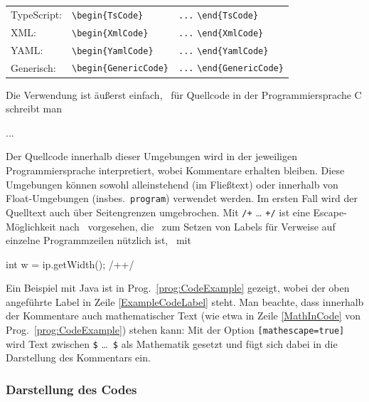 \begin{table}
\begin{tabular}{@{}lll@{}}
	TypeScript:  & \verb!\begin{TsCode}!
		& \verb!...! \verb!\end{TsCode}! \\
	XML:         & \verb!\begin{XmlCode}!
		& \verb!...! \verb!\end{XmlCode}! \\
	YAML:        & \verb!\begin{YamlCode}!
		& \verb!...! \verb!\end{YamlCode}! \\
	Generisch:   & \verb!\begin{GenericCode}!
		& \verb!...! \verb!\end{GenericCode}! \\
	\bottomrule
\end{tabular}
\end{table}
%
Die Verwendung ist äußerst einfach, \zB\ für Quellcode in der
Programmiersprache C schreibt man
%
\begin{GenericCode}[numbers=none]
\begin{CCode}
    ... 
\end{CCode}
\end{GenericCode}
%
Der Quellcode innerhalb dieser Umgebungen wird in der jeweiligen
Programmiersprache interpretiert, wobei Kommentare erhalten bleiben. Diese
Umgebungen können sowohl alleinstehend (im Fließtext) oder innerhalb von
Float-Umgebungen (insbes.\ \texttt{program}) verwendet werden. Im ersten Fall
wird der Quelltext auch über Seitengrenzen umgebrochen. Mit \verb!/+! \ldots
\verb!+/! ist eine Escape-Möglichkeit nach \latex\ vorgesehen, die \va\ zum
Setzen von Labels für Verweise auf einzelne Programmzeilen nützlich ist, \zB\
mit
%
\begin{GenericCode}[numbers=none]
int w = ip.getWidth(); /+\label{ExampleCodeLabel}+/
\end{GenericCode}
%
Ein Beispiel mit Java ist in Prog.~\ref{prog:CodeExample} gezeigt, wobei der
oben angeführte Label in Zeile \ref{ExampleCodeLabel} steht. Man beachte,
dass innerhalb der Kommentare auch mathematischer Text (wie etwa in Zeile
\ref{MathInCode} von Prog.~\ref{prog:CodeExample}) stehen kann: Mit der Option
\verb![mathescape=true]! wird Text zwischen \verb!$! \ldots\ \verb!$! als
Mathematik gesetzt und fügt sich dabei in die Darstellung des Kommentars ein.


\subsubsection{Darstellung des Codes}
\label{sec:CodeStil}

